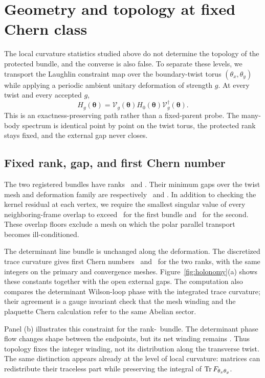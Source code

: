 \section{Geometry and topology at fixed Chern class}
\label{sec:topology}

The local curvature statistics studied above do not determine the topology of
the protected bundle, and the converse is also false.  To separate these
levels, we transport the Laughlin constraint map over the boundary-twist torus
$(\theta_x,\theta_y)$ while applying a periodic ambient unitary deformation
of strength $g$.  At every twist and every accepted $g$,
\[
 H_g(\boldsymbol\theta)
 =\mathcal V_g(\boldsymbol\theta)
 H_0(\boldsymbol\theta)
 \mathcal V_g^\dagger(\boldsymbol\theta).
\]
This is an exactness-preserving path rather than a fixed-parent probe.  The
many-body spectrum is identical point by point on the twist torus, the
protected rank stays fixed, and the external gap never closes.

\subsection{Fixed rank, gap, and first Chern number}

The two registered bundles have ranks \HolonomyNThreeRank\ and
\HolonomyNFourRank.  Their minimum gaps over the twist mesh and deformation
family are respectively \HolonomyNThreeMinimumGap\ and
\HolonomyNFourMinimumGap.  In addition to checking the kernel residual at
each vertex, we require the smallest singular value of every neighboring-frame
overlap to exceed \HolonomyNThreeMinimumOverlapSingularValue\ for the first
bundle and \HolonomyNFourMinimumOverlapSingularValue\ for the second.  These
overlap floors exclude a mesh on which the polar parallel transport becomes
ill-conditioned.

The determinant line bundle is unchanged along the deformation.  The
discretized trace curvature gives first Chern numbers
\HolonomyNThreeChernNumber\ and \HolonomyNFourChernNumber\ for the two ranks,
with the same integers on the primary and convergence meshes.
Figure~\ref{fig:holonomy}(a) shows these constants together with the open
external gaps.  The computation also compares the determinant Wilson-loop
phase with the integrated trace curvature; their agreement is a gauge
invariant check that the mesh winding and the plaquette Chern calculation
refer to the same Abelian sector.

Panel (b) illustrates this constraint for the rank-\HolonomyNFourRank\
bundle.  The determinant phase flow changes shape between the endpoints, but
its net winding remains \HolonomyNFourChernNumber.  Thus topology fixes the
integer winding, not its distribution along the transverse twist.  The same
distinction appears already at the level of local curvature: matrices can
redistribute their traceless part while preserving the integral of
$\operatorname{Tr} F_{\theta_x\theta_y}$.

